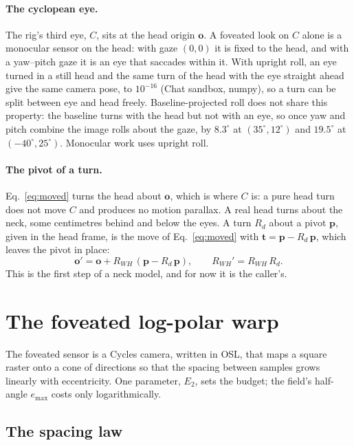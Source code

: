 \documentclass[11pt,a4paper]{article}
\newcommand{\vb}[1]{\mathbf{#1}}
\newcommand{\emax}{e_{\max}}
\begin{document}
\paragraph{The cyclopean eye.} The rig's third eye, $C$, sits at the head origin $\vb{o}$. A foveated look on
$C$ alone is a monocular sensor on the head: with gaze $(0,0)$ it is fixed to the head, and with a yaw--pitch gaze
it is an eye that saccades within it. With upright roll, an eye turned in a still head and the same turn of the
head with the eye straight ahead give the same camera pose, to $10^{-16}$ (Chat sandbox, numpy), so a turn can be
split between eye and head freely. Baseline-projected roll does not share this property: the baseline turns with
the head but not with an eye, so once yaw and pitch combine the image rolls about the gaze, by $8.3^\circ$ at
$(35^\circ, 12^\circ)$ and $19.5^\circ$ at $(-40^\circ, 25^\circ)$. Monocular work uses upright roll.

\paragraph{The pivot of a turn.} Eq.~\eqref{eq:moved} turns the head about $\vb{o}$, which is where $C$ is: a
pure head turn does not move $C$ and produces no motion parallax. A real head turns about the neck, some
centimetres behind and below the eyes. A turn $R_d$ about a pivot $\vb{p}$, given in the head frame, is the move
of Eq.~\eqref{eq:moved} with $\vb{t} = \vb{p} - R_d\,\vb{p}$, which leaves the pivot in place:
\begin{equation}\label{eq:pivot}
\vb{o}' = \vb{o} + R_{WH}\,(\vb{p} - R_d\,\vb{p}), \qquad R_{WH}' = R_{WH}\,R_d .
\end{equation}
This is the first step of a neck model, and for now it is the caller's.

\section{The foveated log-polar warp}\label{sec:warp}

The foveated sensor is a Cycles camera, written in OSL, that maps a square raster onto a cone of directions so
that the spacing between samples grows linearly with eccentricity. One parameter, $E_2$, sets the budget; the
field's half-angle $\emax$ costs only logarithmically.

\subsection{The spacing law}\label{sec:spacing}
\end{document}

